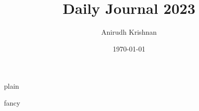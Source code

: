 \documentclass[10pt, oneside]{book}
\author{Anirudh Krishnan}
\title{Daily Journal 2023}
\date{\today}
\begin{document}
\layout
\begin{titlepage}
  
  \frontmatter
\end{titlepage}

\renewcommand{\baselinestretch}{0.25}\normalsize
\tableofcontents
\renewcommand{\baselinestretch}{1.0}\normalsize


\mainmatter


\fancypagestyle
  {plain}
  {\fancyhf{}
    \renewcommand{\headrulewidth}{0pt}
    \renewcommand{\footrulewidth}{0pt}}

\fancypagestyle
  {fancy}{
    \fancyfoot[]{}
    \renewcommand{\headrulewidth}{0pt}
    \renewcommand{\footrulewidth}{0pt}}

\pagestyle{fancy}






% 
% 




\end{document}
